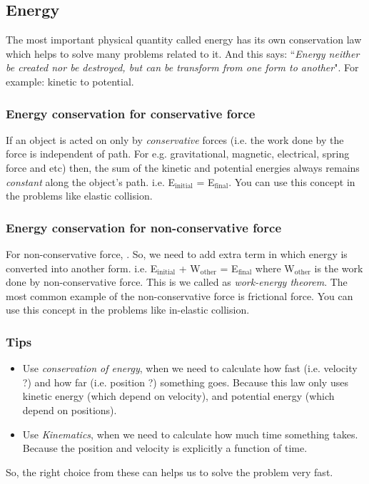 \subsection{Energy}

The most important physical quantity called energy has its own conservation law which helps to solve many problems related to it. And this says: ``\emph{Energy neither be created nor be destroyed, but can be transform from one form to another}". For example: kinetic to potential.

\subsubsection{Energy conservation for conservative force} \label{ecf}

If an object is acted on only by \emph{conservative} forces (i.e. the work done by the force is independent of path. For e.g. gravitational, magnetic, electrical, spring force and etc) then, the sum of the kinetic and potential energies always remains \emph{constant} along the object's path. i.e. E$_\text{initial}$ = E$_\text{final}$. You can use this concept in the problems like elastic collision.

\subsubsection{Energy conservation for non-conservative force}

For non-conservative force, . So, we need to add extra term in which energy is converted into another form. i.e. E$_\text{initial}$ + W$_\text{other}$ = E$_\text{final}$ where W$_\text{other}$ is the work done by non-conservative force. This is we called as \emph{work-energy theorem}. The most common example of the non-conservative force is frictional force. You can use this concept in the problems like in-elastic collision.

\subsubsection*{Tips}
\begin{itemize}
\item Use \emph{conservation of energy}, when we need to calculate how fast (i.e. velocity ?) and how far (i.e. position ?) something goes. Because this law only uses kinetic energy (which depend on velocity), and potential energy (which depend on positions).
\item Use \emph{Kinematics}, when we need to calculate how much time something takes. Because the position and velocity is explicitly a function of time.
\end{itemize}
So, the right choice from these can helps us to solve the problem very fast.

